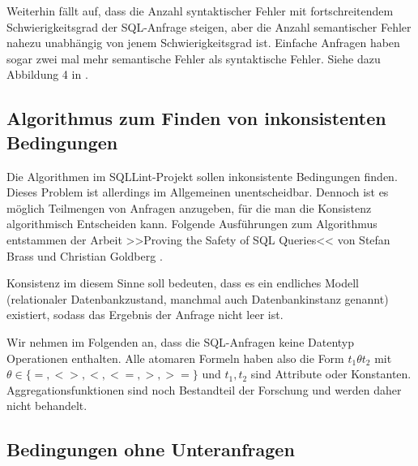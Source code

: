 Weiterhin fällt auf, dass die Anzahl syntaktischer Fehler mit fortschreitendem Schwierigkeitsgrad der SQL-Anfrage steigen, aber die Anzahl semantischer Fehler nahezu unabhängig von jenem Schwierigkeitsgrad ist. Einfache Anfragen haben sogar zwei mal mehr semantische Fehler als syntaktische Fehler. Siehe dazu Abbildung 4 in \cite{sqllint1}.

\subsection{Algorithmus zum Finden von inkonsistenten Bedingungen}

Die Algorithmen im SQLLint-Projekt sollen inkonsistente Bedingungen finden. Dieses Problem ist allerdings im Allgemeinen unentscheidbar. Dennoch ist es möglich Teilmengen von Anfragen anzugeben, für die man die Konsistenz algorithmisch Entscheiden kann. Folgende Ausführungen zum Algorithmus entstammen der Arbeit >>Proving the Safety of SQL Queries<< von Stefan Brass und Christian Goldberg \cite{brass1}.

Konsistenz im diesem Sinne soll bedeuten, dass es ein endliches Modell (relationaler Datenbankzustand, manchmal auch Datenbankinstanz genannt) existiert, sodass das Ergebnis der Anfrage nicht leer ist.

Wir nehmen im Folgenden an, dass die SQL-Anfragen keine Datentyp Operationen enthalten. Alle atomaren Formeln haben also die Form $t_1\theta t_2$ mit $\theta\in \{=,<>,<,<=,>,>=\}$ und $t_1,t_2$ sind Attribute oder Konstanten. Aggregationsfunktionen sind noch Bestandteil der Forschung und werden daher nicht behandelt.

\subsection{Bedingungen ohne Unteranfragen}

